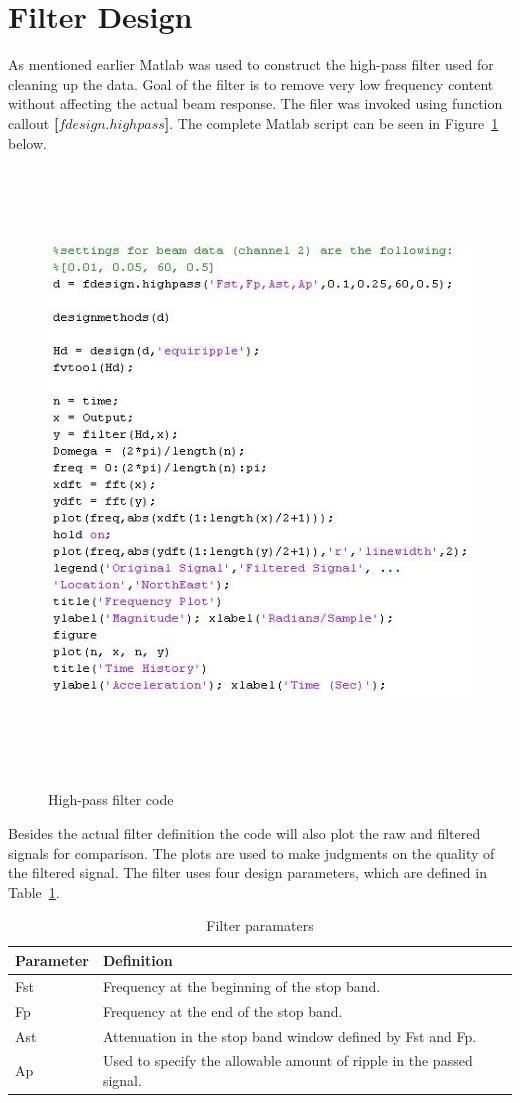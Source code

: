 \documentclass[paper=a4, fontsize=12pt]{scrartcl} %
\begin{document}
\section*{Filter Design}
As mentioned earlier Matlab was used to construct the high-pass filter used for cleaning up the data. Goal of the filter is to remove very low frequency content without affecting the actual beam response. The filer was invoked using function callout \textbf{[$fdesign.highpass$]}. The complete Matlab script can be seen in Figure~\ref{fig:FilterCode} below.
%
	\begin{figure}[H]
		\centering
		{
		\includegraphics[height=16.0cm]{FilterCode.jpg}
		}
		\caption{High-pass filter code}
		\label{fig:FilterCode}
	\end{figure}
%
Besides the actual filter definition the code will also plot the raw and filtered signals for comparison. The plots are used to make judgments on the quality of the filtered signal. The filter uses four design parameters, which are defined in Table~\ref{table:filterParams}.
%
\begin{table}[H]
\centering
\begin{tabular}{ l | l }
		\textbf{Parameter} & \textbf{Definition} \\
	\hline                       
		Fst & Frequency at the beginning of the stop band. \\
	\hline
		Fp & Frequency at the end of the stop band. \\
	\hline
		Ast & Attenuation in the stop band window defined by Fst and Fp. \\
	\hline  
		Ap & Used to specify the allowable amount of ripple in the passed signal. \\
\end{tabular}
\caption{Filter paramaters}
\label{table:filterParams}
\end{table}
\end{document}
